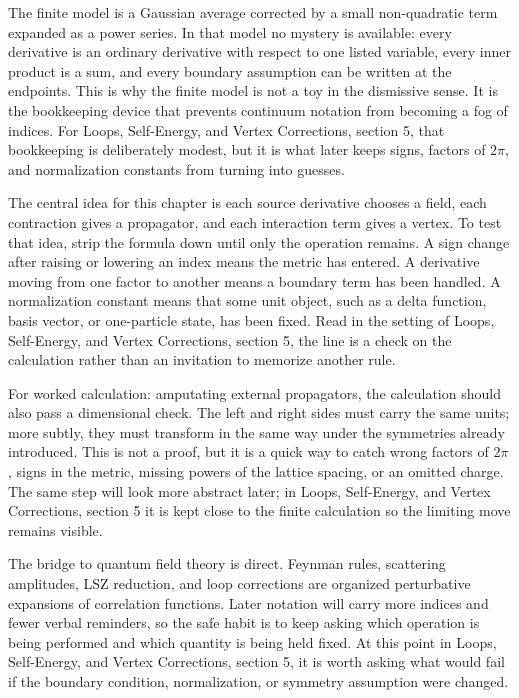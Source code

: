 The finite model is a Gaussian average corrected by a small non-quadratic term expanded as a power series.  In that model no mystery is available: every derivative is an ordinary derivative with respect to one listed variable, every inner product is a sum, and every boundary assumption can be written at the endpoints.  This is why the finite model is not a toy in the dismissive sense.  It is the bookkeeping device that prevents continuum notation from becoming a fog of indices.  For Loops, Self-Energy, and Vertex Corrections, section 5, that bookkeeping is deliberately modest, but it is what later keeps signs, factors of \(2\pi\), and normalization constants from turning into guesses.

The central idea for this chapter is each source derivative chooses a field, each contraction gives a propagator, and each interaction term gives a vertex.  To test that idea, strip the formula down until only the operation remains.  A sign change after raising or lowering an index means the metric has entered.  A derivative moving from one factor to another means a boundary term has been handled.  A normalization constant means that some unit object, such as a delta function, basis vector, or one-particle state, has been fixed.  Read in the setting of Loops, Self-Energy, and Vertex Corrections, section 5, the line is a check on the calculation rather than an invitation to memorize another rule.

For worked calculation: amputating external propagators, the calculation should also pass a dimensional check.  The left and right sides must carry the same units; more subtly, they must transform in the same way under the symmetries already introduced.  This is not a proof, but it is a quick way to catch wrong factors of \(2\pi\), signs in the metric, missing powers of the lattice spacing, or an omitted charge.  The same step will look more abstract later; in Loops, Self-Energy, and Vertex Corrections, section 5 it is kept close to the finite calculation so the limiting move remains visible.

The bridge to quantum field theory is direct.  Feynman rules, scattering amplitudes, LSZ reduction, and loop corrections are organized perturbative expansions of correlation functions.  Later notation will carry more indices and fewer verbal reminders, so the safe habit is to keep asking which operation is being performed and which quantity is being held fixed.  At this point in Loops, Self-Energy, and Vertex Corrections, section 5, it is worth asking what would fail if the boundary condition, normalization, or symmetry assumption were changed.

